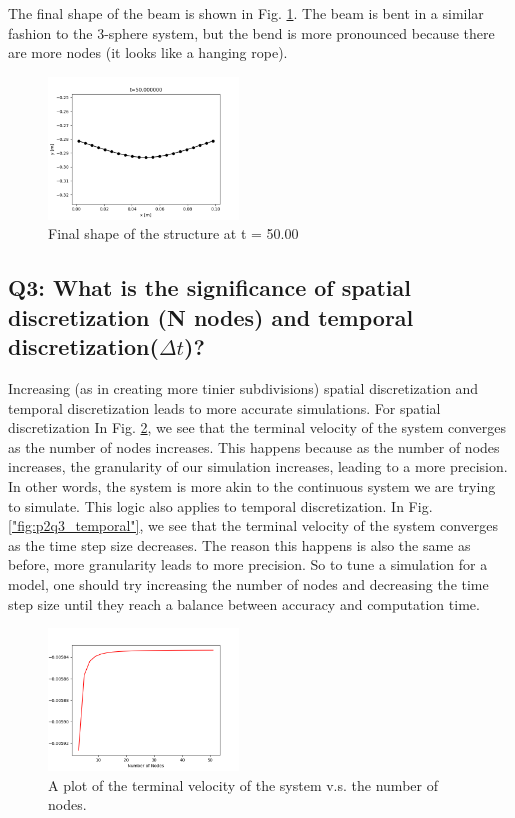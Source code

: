\documentclass[letterpaper, 10 pt, conference]{ieeeconf}  %
\begin{document}
The final shape of the beam is shown in Fig. \ref{"fig:p2q2_final_shape"}. The beam is bent in a similar fashion to the 3-sphere system, but the bend is more pronounced because there are more nodes (it looks like a hanging rope).

\begin{figure}[!ht]
        \centering
        \includegraphics[width=0.45\textwidth,keepaspectratio]{p2q2_implicit_50.00.png}
        \caption{Final shape of the structure at t = 50.00}
        \label{"fig:p2q2_final_shape"}
\end{figure}

\subsection*{Q3: What is the significance of spatial discretization (N nodes) and temporal discretization($\Delta t$)? }

Increasing (as in creating more tinier subdivisions) spatial discretization and temporal discretization leads to more accurate simulations. For spatial discretization In Fig. \ref{"fig:p2q3_spatial"}, we see that the terminal velocity of the system converges as the number of nodes increases. This happens because as the number of nodes increases, the granularity of our simulation increases, leading to a more precision. In other words, the system is more akin to the continuous system we are trying to simulate. This logic also applies to temporal discretization. In Fig. \ref{"fig:p2q3_temporal"}, we see that the terminal velocity of the system converges as the time step size decreases. The reason this happens is also the same as before, more granularity leads to more precision. So to tune a simulation for a model, one should try increasing the number of nodes and decreasing the time step size until they reach a balance between accuracy and computation time.

\begin{figure}[!ht]
        \centering
        \includegraphics[width=0.45\textwidth,keepaspectratio]{p2q3_implicit_vterm_vs_nodes.png}
        \caption{A plot of the terminal velocity of the system v.s. the number of nodes.}
        \label{"fig:p2q3_spatial"}
\end{figure}
\end{document}
